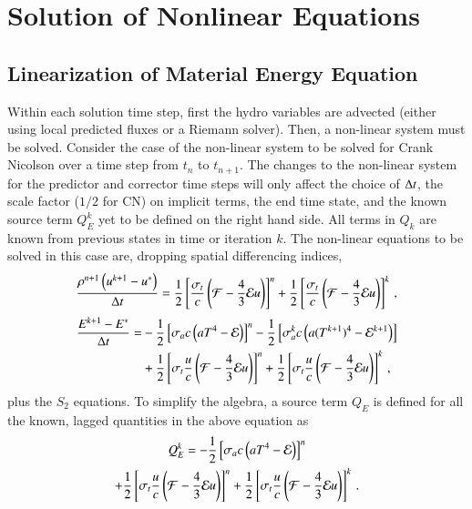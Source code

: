 \section{Solution of Nonlinear Equations}
\subsection{Linearization of Material Energy Equation}

Within each solution time step, first the hydro variables are advected (either
using local predicted fluxes or a Riemann solver).  Then, a non-linear system
must be solved.  Consider the case of the non-linear system to be solved for
Crank Nicolson over a time step from $t_n$ to $t_{n+1}$.  The changes to the
non-linear system for the predictor and corrector time steps will only affect
the choice of $\Delta t$, the scale factor ($1/2$ for CN) on implicit terms, the end time
state, and the known source term $Q_E^k$ yet to be defined on the right
hand side. All terms in $Q_k$ are known from previous states in time or iteration $k$.  The non-linear
equations to be solved in this case are, dropping spatial differencing indices,
\begin{equation}
  \frac{\rho^{n+1}\left(u^{k+1}-u^*\right)}{\Delta t} = 
   \frac{1}{2}\left[\frac{\sigma_{t}}{c}\left(\mathcal{F}-\frac{4}{3}\mathcal{E} u\right)\right]^n
  +\frac{1}{2}\left[\frac{\sigma_{t}}{c}\left(\mathcal{F}-\frac{4}{3}\mathcal{E} u\right)\right]^k
  \, ,
\label{eq:vel_update}
\end{equation}
\begin{equation}\begin{split}
  \frac{E^{k+1}-E^*}{\Delta t} = &
  -\frac{1}{2}\left[\sigma_{a} c\left(aT^4 - \mathcal{E}\right)\right]^n
  -\frac{1}{2}\left[\sigma_{a}^k c\left(a(T^{k+1})^4 - \mathcal{E}^{k+1}\right)\right]\\
  &+\frac{1}{2}\left[\sigma_{t}\frac{u}{c}\left(\mathcal{F}-\frac{4}{3}\mathcal{E} u\right)\right]^n
   +\frac{1}{2}\left[\sigma_{t}\frac{u}{c}\left(\mathcal{F}-\frac{4}{3}\mathcal{E} u\right)\right]^k
  \, ,
\label{eq:mat}
\end{split}\end{equation}
plus the $S_2$ equations.  To simplify the algebra, a source term $Q_E$ is
defined for all the known, lagged quantities in the above equation as
\begin{multline}
   Q_E^{k} = -\frac{1}{2}\left[\sigma_a c\left( aT^4 - \mathcal{E}\right)\right]^n\\
   +\frac{1}{2}\left[\sigma_t \frac{u}{c} \left( \mathcal{F} - \frac{4}{3} \mathcal{E} u \right)\right]^n + \frac{1}{2}\left[\sigma_t \frac{u}{c} \left( \mathcal{F} - \frac{4}{3} \mathcal{E} u \right)\right]^k \, .
\end{multline}
